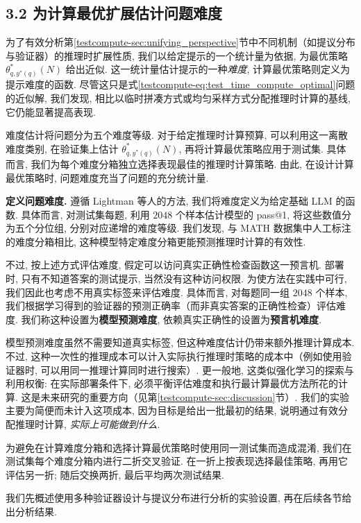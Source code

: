 \subsection*{3.2 为计算最优扩展估计问题难度}
为了有效分析第\ref{testcompute-sec:unifying_perspective}节中不同机制（如提议分布与验证器）的推理时扩展性质, 我们以给定提示的一个统计量为依据, 为最优策略 $\theta^{*}_{q,y^*(q)}(N)$ 给出近似. 这一统计量估计提示的一种\emph{难度}, 计算最优策略则定义为提示难度的函数. 尽管这只是式\eqref{testcompute-eq:test_time_compute_optimal}问题的近似解, 我们发现, 相比以临时拼凑方式或均匀采样方式分配推理时计算的基线, 它仍能显著提高表现. 

难度估计将问题分为五个难度等级. 对于给定推理时计算预算, 可以利用这一离散难度类别, 在验证集上估计 $\theta^{*}_{q,y^*(q)}(N)$, 再将计算最优策略应用于测试集. 具体而言, 我们为每个难度分箱独立选择表现最佳的推理时计算策略. 由此, 在设计计算最优策略时, 问题难度充当了问题的充分统计量. 

\textbf{定义问题难度. }遵循 Lightman 等人\cite{testcompute-lightman2023lets}的方法, 我们将难度定义为给定基础 LLM 的函数. 具体而言, 对测试集每题, 利用 $2048$ 个样本估计模型的 pass@1, 将这些数值分为五个分位组, 分别对应递增的难度等级. 我们发现, 与 MATH 数据集中人工标注的难度分箱相比, 这种模型特定难度分箱更能预测推理时计算的有效性. 

不过, 按上述方式评估难度, 假定可以访问真实正确性检查函数这一预言机. 部署时, 只有不知道答案的测试提示, 当然没有这种访问权限. 为使方法在实践中可行, 我们因此也考虑不用真实标签来评估难度. 具体而言, 对每题同一组 $2048$ 个样本, 我们根据学习得到的验证器的预测正确率（而非真实答案的正确性检查）评估难度. 我们称这种设置为\textbf{模型预测难度}, 依赖真实正确性的设置为\textbf{预言机难度}. 

模型预测难度虽然不需要知道真实标签, 但这种难度估计仍带来额外推理计算成本. 不过, 这种一次性的推理成本可以计入实际执行推理时策略的成本中（例如使用验证器时, 可以用同一推理计算同时进行搜索）. 更一般地, 这类似强化学习的探索与利用权衡: 在实际部署条件下, 必须平衡评估难度和执行最计算最优方法所花的计算. 这是未来研究的重要方向（见第\ref{testcompute-sec:discussion}节）. 我们的实验主要为简便而未计入这项成本, 因为目标是给出一批最初的结果, 说明通过有效分配推理时计算, \emph{实际上可能做到什么}. 

为避免在计算难度分箱和选择计算最优策略时使用同一测试集而造成混淆, 我们在测试集每个难度分箱内进行二折交叉验证. 在一折上按表现选择最佳策略, 再用它评估另一折; 随后交换两折, 最后平均两次测试结果. 

我们先概述使用多种验证器设计与提议分布进行分析的实验设置, 再在后续各节给出分析结果. 

